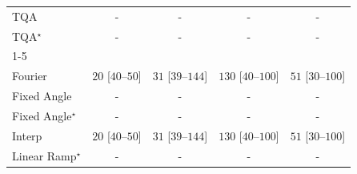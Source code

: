\begin{tabular}{l|cccc|}
TQA & {\cellcolor[HTML]{000000}} \color[HTML]{F1F1F1} {\cellcolor{white}} \color{black} - & {\cellcolor[HTML]{000000}} \color[HTML]{F1F1F1} {\cellcolor{white}} \color{black} - & {\cellcolor[HTML]{000000}} \color[HTML]{F1F1F1} {\cellcolor{white}} \color{black} - & {\cellcolor[HTML]{000000}} \color[HTML]{F1F1F1} {\cellcolor{white}} \color{black} - \\
TQA$^\star$ & {\cellcolor[HTML]{000000}} \color[HTML]{F1F1F1} {\cellcolor{white}} \color{black} - & {\cellcolor[HTML]{000000}} \color[HTML]{F1F1F1} {\cellcolor{white}} \color{black} - & {\cellcolor[HTML]{000000}} \color[HTML]{F1F1F1} {\cellcolor{white}} \color{black} - & {\cellcolor[HTML]{000000}} \color[HTML]{F1F1F1} {\cellcolor{white}} \color{black} - \\
\cline{1-5}
\multicolumn{5}{c}{\rule{0pt}{8pt}PP} \\
\midrule
Fourier & {\cellcolor[HTML]{F4FBF1}} \color[HTML]{000000} $20$ [$40$--$50$] & {\cellcolor[HTML]{F2FAEF}} \color[HTML]{000000} $31$ [$39$--$144$] & {\cellcolor[HTML]{DCF2D7}} \color[HTML]{000000} $130$ [$40$--$100$] & {\cellcolor[HTML]{EFF9EB}} \color[HTML]{000000} $51$ [$30$--$100$] \\
Fixed Angle & {\cellcolor[HTML]{000000}} \color[HTML]{F1F1F1} {\cellcolor{white}} \color{black} - & {\cellcolor[HTML]{000000}} \color[HTML]{F1F1F1} {\cellcolor{white}} \color{black} - & {\cellcolor[HTML]{000000}} \color[HTML]{F1F1F1} {\cellcolor{white}} \color{black} - & {\cellcolor[HTML]{000000}} \color[HTML]{F1F1F1} {\cellcolor{white}} \color{black} - \\
Fixed Angle$^\star$ & {\cellcolor[HTML]{000000}} \color[HTML]{F1F1F1} {\cellcolor{white}} \color{black} - & {\cellcolor[HTML]{000000}} \color[HTML]{F1F1F1} {\cellcolor{white}} \color{black} - & {\cellcolor[HTML]{000000}} \color[HTML]{F1F1F1} {\cellcolor{white}} \color{black} - & {\cellcolor[HTML]{000000}} \color[HTML]{F1F1F1} {\cellcolor{white}} \color{black} - \\
Interp & {\cellcolor[HTML]{F4FBF1}} \color[HTML]{000000} $20$ [$40$--$50$] & {\cellcolor[HTML]{F2FAEF}} \color[HTML]{000000} $31$ [$39$--$144$] & {\cellcolor[HTML]{DCF2D7}} \color[HTML]{000000} $130$ [$40$--$100$] & {\cellcolor[HTML]{EFF9EB}} \color[HTML]{000000} $51$ [$30$--$100$] \\
Linear Ramp$^\star$ & {\cellcolor[HTML]{000000}} \color[HTML]{F1F1F1} {\cellcolor{white}} \color{black} - & {\cellcolor[HTML]{000000}} \color[HTML]{F1F1F1} {\cellcolor{white}} \color{black} - & {\cellcolor[HTML]{000000}} \color[HTML]{F1F1F1} {\cellcolor{white}} \color{black} - & {\cellcolor[HTML]{000000}} \color[HTML]{F1F1F1} {\cellcolor{white}} \color{black} - \\

\end{tabular}
